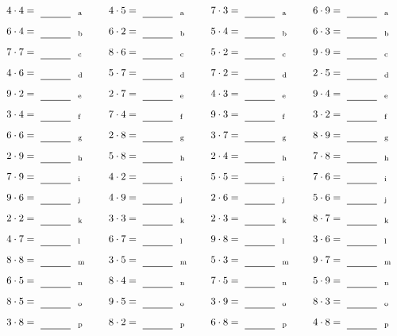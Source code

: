 \documentclass
[
  draft    = true,
  fontsize = 11pt,
  parskip  = half-
]
{scrartcl}
\begin{document}
\par\vfill\par
\begin{align*}
    \pline{4\cdot4}&=\rline{a}
  & \pline{4\cdot5}&=\rline{a}
  & \pline{7\cdot3}&=\rline{a}
  & \pline{6\cdot9}&=\rline{a} \\[1ex]
    \pline{6\cdot4}&=\rline{b}
  & \pline{6\cdot2}&=\rline{b}
  & \pline{5\cdot4}&=\rline{b}
  & \pline{6\cdot3}&=\rline{b} \\[1ex]
    \pline{7\cdot7}&=\rline{c}
  & \pline{8\cdot6}&=\rline{c}
  & \pline{5\cdot2}&=\rline{c}
  & \pline{9\cdot9}&=\rline{c} \\[1ex]
    \pline{4\cdot6}&=\rline{d}
  & \pline{5\cdot7}&=\rline{d}
  & \pline{7\cdot2}&=\rline{d}
  & \pline{2\cdot5}&=\rline{d} \\[1ex]
    \pline{9\cdot2}&=\rline{e}
  & \pline{2\cdot7}&=\rline{e}
  & \pline{4\cdot3}&=\rline{e}
  & \pline{9\cdot4}&=\rline{e} \\[1ex]
    \pline{3\cdot4}&=\rline{f}
  & \pline{7\cdot4}&=\rline{f}
  & \pline{9\cdot3}&=\rline{f}
  & \pline{3\cdot2}&=\rline{f} \\[1ex]
    \pline{6\cdot6}&=\rline{g}
  & \pline{2\cdot8}&=\rline{g}
  & \pline{3\cdot7}&=\rline{g}
  & \pline{8\cdot9}&=\rline{g} \\[1ex]
    \pline{2\cdot9}&=\rline{h}
  & \pline{5\cdot8}&=\rline{h}
  & \pline{2\cdot4}&=\rline{h}
  & \pline{7\cdot8}&=\rline{h} \\[1ex]
    \pline{7\cdot9}&=\rline{i}
  & \pline{4\cdot2}&=\rline{i}
  & \pline{5\cdot5}&=\rline{i}
  & \pline{7\cdot6}&=\rline{i} \\[1ex]
    \pline{9\cdot6}&=\rline{j}
  & \pline{4\cdot9}&=\rline{j}
  & \pline{2\cdot6}&=\rline{j}
  & \pline{5\cdot6}&=\rline{j} \\[1ex]
    \pline{2\cdot2}&=\rline{k}
  & \pline{3\cdot3}&=\rline{k}
  & \pline{2\cdot3}&=\rline{k}
  & \pline{8\cdot7}&=\rline{k} \\[1ex]
    \pline{4\cdot7}&=\rline{l}
  & \pline{6\cdot7}&=\rline{l}
  & \pline{9\cdot8}&=\rline{l}
  & \pline{3\cdot6}&=\rline{l} \\[1ex]
    \pline{8\cdot8}&=\rline{m}
  & \pline{3\cdot5}&=\rline{m}
  & \pline{5\cdot3}&=\rline{m}
  & \pline{9\cdot7}&=\rline{m} \\[1ex]
    \pline{6\cdot5}&=\rline{n}
  & \pline{8\cdot4}&=\rline{n}
  & \pline{7\cdot5}&=\rline{n}
  & \pline{5\cdot9}&=\rline{n} \\[1ex]
    \pline{8\cdot5}&=\rline{o}
  & \pline{9\cdot5}&=\rline{o}
  & \pline{3\cdot9}&=\rline{o}
  & \pline{8\cdot3}&=\rline{o} \\[1ex]
    \pline{3\cdot8}&=\rline{p}
  & \pline{8\cdot2}&=\rline{p}
  & \pline{6\cdot8}&=\rline{p}
  & \pline{4\cdot8}&=\rline{p}
\end{align*}
\end{document}
